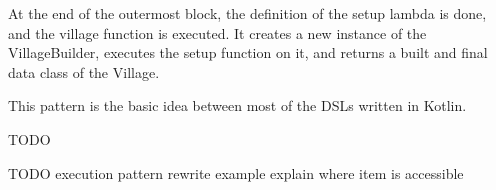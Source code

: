 At the end of the outermost block, the definition of the setup lambda is done, and the village function is executed. It creates a new instance of the VillageBuilder, executes the setup function on it, and returns a built and final data class of the Village.

This pattern is the basic idea between most of the DSLs written in Kotlin.

TODO

TODO execution pattern
    rewrite example
    explain where item is accessible